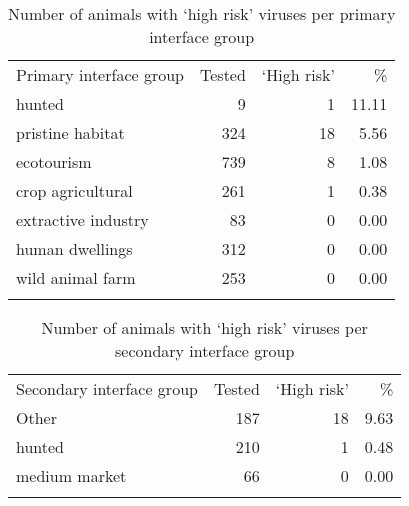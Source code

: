\documentclass[11pt,article,oneside]{article}
\begin{document}
\begin{longtable}[c]{@{}lrrr@{}}
\toprule\addlinespace
Primary interface group & Tested & `High risk' & \%
\\\addlinespace
\midrule\endhead
hunted & 9 & 1 & 11.11
\\\addlinespace
pristine habitat & 324 & 18 & 5.56
\\\addlinespace
ecotourism & 739 & 8 & 1.08
\\\addlinespace
crop agricultural & 261 & 1 & 0.38
\\\addlinespace
extractive industry & 83 & 0 & 0.00
\\\addlinespace
human dwellings & 312 & 0 & 0.00
\\\addlinespace
wild animal farm & 253 & 0 & 0.00
\\\addlinespace
\bottomrule
\addlinespace
\caption{Number of animals with `high risk' viruses per primary
interface group}
\end{longtable}

\begin{longtable}[c]{@{}lrrr@{}}
\toprule\addlinespace
Secondary interface group & Tested & `High risk' & \%
\\\addlinespace
\midrule\endhead
Other & 187 & 18 & 9.63
\\\addlinespace
hunted & 210 & 1 & 0.48
\\\addlinespace
medium market & 66 & 0 & 0.00
\\\addlinespace
\bottomrule
\addlinespace
\caption{Number of animals with `high risk' viruses per secondary
interface group}
\end{longtable}
\end{document}
